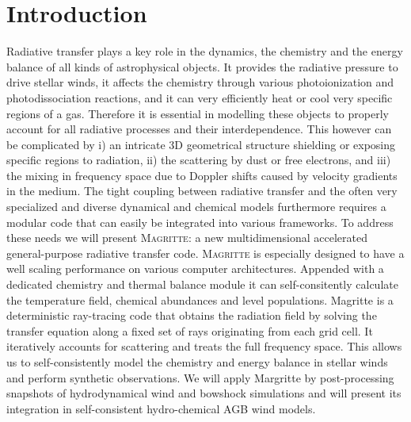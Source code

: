 \documentclass[a4paper,fleqn,usenatbib]{mnras}
\begin{document}


\begingroup
\let\clearpage\relax
\endgroup
\newpage


\section{Introduction}

Radiative transfer plays a key role in the dynamics, the chemistry and the energy balance of all kinds of astrophysical objects. It provides the radiative pressure to drive stellar winds, it affects the chemistry through various photoionization and photodissociation reactions, and it can very efficiently heat or cool very specific regions of a gas. Therefore it is essential in modelling these objects to properly account for all radiative processes and their interdependence. This however can be complicated by i) an intricate 3D geometrical structure shielding or exposing specific regions to radiation, ii) the scattering by dust or free electrons, and iii) the mixing in frequency space due to Doppler shifts caused by velocity gradients in the medium. The tight coupling between radiative transfer and the often very specialized and diverse dynamical and chemical models furthermore requires a modular code that can easily be integrated into various frameworks. To address these needs we will present \textsc{Magritte}: a new multidimensional accelerated general-purpose radiative transfer code. \textsc{Magritte} is especially designed to have a well scaling performance on various computer architectures.  Appended with a dedicated chemistry and thermal balance module it can self-consitently calculate the temperature field, chemical abundances and level populations. Magritte is a deterministic ray-tracing code that obtains the radiation field by solving the transfer equation along a fixed set of rays originating from each grid cell. It iteratively accounts for scattering and treats the full frequency space. This allows us to self-consistently model the chemistry and energy balance in stellar winds and perform synthetic observations. We will apply {\sc Margritte} by post-processing snapshots of hydrodynamical wind and bowshock simulations and will present its integration in self-consistent hydro-chemical AGB wind models.
\end{document}
